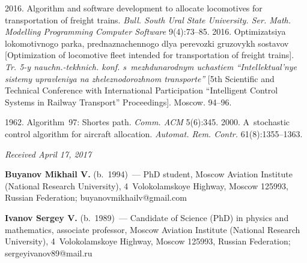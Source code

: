 \begin{multicols}{2}
{{\begin{thebibliography}{99}
 2016.
Algorithm and software development to allocate locomotives for transportation 
of freight trains. \textit{Bull. South Ural State University. 
Ser. Math. Modelling Programming Computer Software} 9(4):73--85.
 2016. Optimizatsiya lokomotivnogo parka, prednaznachennogo 
dlya perevozki gruzovykh sostavov [Optimization of locomotive 
fleet intended for transportation of freight trains]. 
\textit{Tr. 5-y nauchn.-tekhnich. konf. s~mezhdunarodnym uchastiem 
``Intellektual'nye sistemy upravleniya na zheleznodorozhnom transporte''} 
[5th Scientific and Technical Conference with International Participation 
``Intelligent Control Systems in Railway Transport'' Proceedings]. Moscow. 94--96.



 1962. Algorithm~97: Shortes path. \textit{Comm. ACM} 5(6):345.
 2000. A~stochastic control algorithm for aircraft allocation. 
 \textit{Automat. Rem. Contr.} 61(8):1355--1363.
\end{thebibliography}

 }
 }

\end{multicols}

\vspace*{-6pt}

\hfill{\small\textit{Received April 17, 2017}}


\Contr

\noindent
\textbf{Buyanov Mikhail V.} (b.\ 1994)~--- 
PhD student, Moscow Aviation Institute (National Research University), 
4~Volokolamskoye Highway, 
Moscow 125993, Russian Federation; \mbox{buyanovmikhailv@gmail.com}

\vspace*{3pt}

\noindent
\textbf{Ivanov Sergey V.} (b.\ 1989)~--- 
Candidate of Science (PhD) in physics and mathematics,  
associate professor, Moscow Aviation Institute (National Research University), 
4~Volokolamskoye Highway,
Moscow 125993, Russian Federation;  \mbox{sergeyivanov89@mail.ru} 


\vspace*{3pt}

